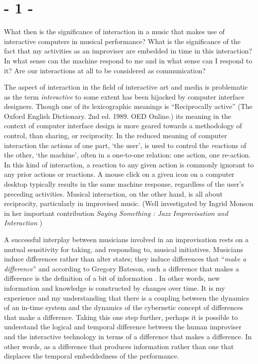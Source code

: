 \documentclass{article}
\begin{document}
\section*{- 1 -}
\label{sec:1}


What then is the significance of interaction in a music that makes use of interactive computers in musical performance? What is the significance of the fact that my activities as an improviser are embedded in time in this interaction?
In what sense can the machine respond to me and in what sense can I respond to it? Are our interactions at all to be considered as communication?

The aspect of interaction in the field of interactive art and media is problematic as the term \emph{interactive} to some extent has been hijacked by computer interface designers. Though one of its lexicographic meanings is ``Reciprocally active'' (The Oxford English Dictionary. 2nd ed. 1989. OED Online.) its meaning in the context of computer interface design is more geared towards a methodology of control, than sharing, or reciprocity. In the reduced meaning of computer interaction the actions of one part, `the user', is used to control the \emph{re}actions of the other, `the machine', often in a one-to-one relation: one action, one re-action. In this kind of interaction, a reaction to any given action is commonly ignorant to any prior actions or reactions. A mouse click on a given icon on a computer desktop typically results in the same machine response, regardless of the user's preceding activities. Musical interaction, on the other hand, is all about reciprocity, particularly in improvised music. (Well investigated by Ingrid Monson in her important contribution \emph{Saying Something : Jazz Improvisation and Interaction} \citep[][]{monson96} )

A successful interplay between musicians involved in an improvisation rests on a mutual sensitivity for taking, and responding to, musical initiatives. Musicians induce differences rather than alter states; they induce differences that ``\emph{make a difference}'' and according to Gregory Bateson, such a difference that makes a difference is the definition of a bit of information \citep[92]{Bateson}. In other words, new information and knowledge is constructed by changes over time. It is my experience and my understanding that there is a coupling between the dynamics of an in-time system and the dynamics of the cybernetic concept of differences that make a difference. Taking this one step further, perhaps it is possible to understand the logical and temporal difference between the human improviser and the interactive technology in terms of a difference that makes a difference. In other words, as a difference that produces information rather than one that displaces the temporal embeddedness of the performance.
\end{document}
